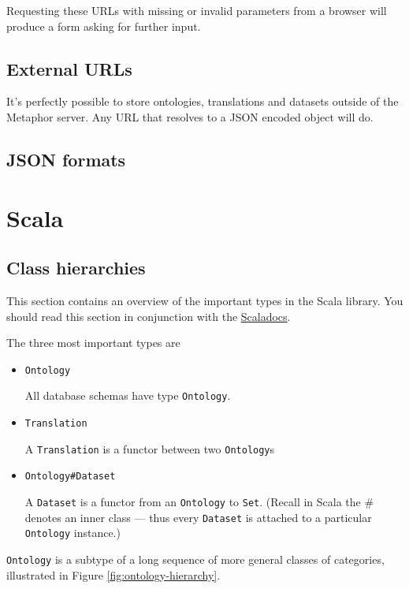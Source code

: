 \documentclass{amsart}
\newcommand{\type}[1]{{\tt #1}}
\begin{document}
Requesting these URLs with missing or invalid parameters from a browser will produce a form asking for further input.

\subsection{External URLs}
It's perfectly possible to store ontologies, translations and datasets outside of the Metaphor server. Any URL that resolves to a JSON encoded object will do.

\subsection{JSON formats}
\label{sec:JSON}

\section{Scala}

\subsection{Class hierarchies}
This section contains an overview of the important types in the Scala library. You should read this section in conjunction with the \href{}{Scaladocs}.

The three most important types are
\begin{itemize}
\item {\color{gray}\type{net.metaphor.api.}}\type{Ontology}

All database schemas have type \type{Ontology}. 

\item {\color{gray}\type{net.metaphor.api.}}\type{Translation}

A \type{Translation} is a functor between two \type{Ontology}s

\item {\color{gray}\type{net.metaphor.api.}}\type{Ontology\#Dataset}

A \type{Dataset} is a functor from an \type{Ontology} to \type{Set}. 
(Recall in Scala the \# denotes an inner class --- thus every \type{Dataset} is attached to a particular \type{Ontology} instance.) 
\end{itemize}

\type{Ontology} is a subtype of a long sequence of more general classes of categories, illustrated in Figure \ref{fig:ontology-hierarchy}.

\end{document}
